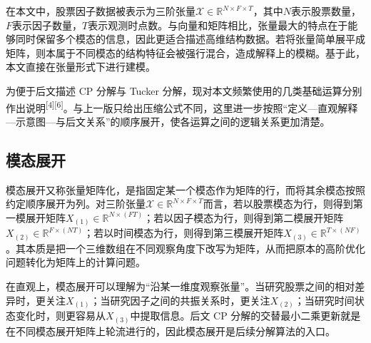 在本文中，股票因子数据被表示为三阶张量$\mathcal{X}\in\mathbb{R}^{N\times F\times T}$，其中$N$表示股票数量，$F$表示因子数量，$T$表示观测时点数。与向量和矩阵相比，张量最大的特点在于能够同时保留多个模态的信息，因此更适合描述高维结构数据。若将张量简单展平成矩阵，则本属于不同模态的结构特征会被强行混合，造成解释上的模糊。基于此，本文直接在张量形式下进行建模。

为便于后文描述 CP 分解与 Tucker 分解，现对本文频繁使用的几类基础运算分别作出说明\textsuperscript{[4][6]}。与上一版只给出压缩公式不同，这里进一步按照“定义—直观解释—示意图—与后文关系”的顺序展开，使各运算之间的逻辑关系更加清楚。

\subsection{模态展开}

模态展开又称张量矩阵化，是指固定某一个模态作为矩阵的行，而将其余模态按照约定顺序展开为列。对三阶张量$\mathcal{X}\in\mathbb{R}^{N\times F\times T}$而言，若以股票模态为行，则得到第一模展开矩阵$X_{(1)}\in\mathbb{R}^{N\times (FT)}$；若以因子模态为行，则得到第二模展开矩阵$X_{(2)}\in\mathbb{R}^{F\times (NT)}$；若以时间模态为行，则得到第三模展开矩阵$X_{(3)}\in\mathbb{R}^{T\times (NF)}$。其本质是把一个三维数组在不同观察角度下改写为矩阵，从而把原本的高阶优化问题转化为矩阵上的计算问题。

在直观上，模态展开可以理解为“沿某一维度观察张量”。当研究股票之间的相对差异时，更关注$X_{(1)}$；当研究因子之间的共振关系时，更关注$X_{(2)}$；当研究时间状态变化时，则更容易从$X_{(3)}$中提取信息。后文 CP 分解的交替最小二乘更新就是在不同模态展开矩阵上轮流进行的，因此模态展开是后续分解算法的入口。

